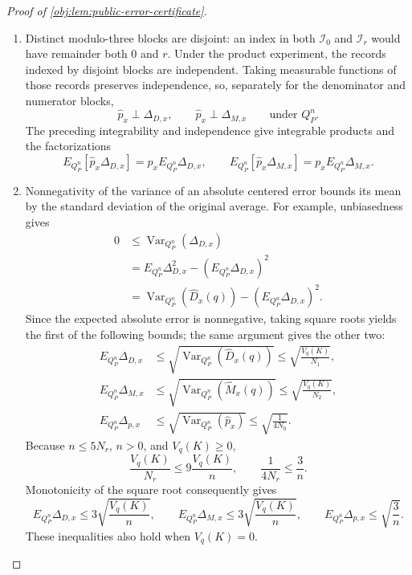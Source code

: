 \begin{proof}[Proof of \cref{obj:lem:public-error-certificate}]
\begin{enumerate}
\item
Distinct modulo-three blocks are disjoint: an index in both
\(\mathcal I_0\) and \(\mathcal I_r\) would have remainder both \(0\) and
\(r\). Under the product experiment, the records indexed by disjoint
blocks are independent. Taking measurable functions of those records
preserves independence, so, separately for the denominator and numerator
blocks,
\[
\widehat p_x\perp\Delta_{D,x},
\qquad
\widehat p_x\perp\Delta_{M,x}
\qquad\text{under }Q_P^n.
\]
The preceding integrability and independence give integrable products and
the factorizations
\[
E_{Q_P^n}[\widehat p_x\Delta_{D,x}]
=p_xE_{Q_P^n}\Delta_{D,x},
\qquad
E_{Q_P^n}[\widehat p_x\Delta_{M,x}]
=p_xE_{Q_P^n}\Delta_{M,x}.
\]

\item
Nonnegativity of the variance of an absolute centered error bounds its
mean by the standard deviation of the original average. For example,
unbiasedness gives
\[
\begin{aligned}
0
&\le\operatorname{Var}_{Q_P^n}(\Delta_{D,x})\\
&=E_{Q_P^n}\Delta_{D,x}^2
  -(E_{Q_P^n}\Delta_{D,x})^2\\
&=\operatorname{Var}_{Q_P^n}(\widehat D_x(q))
  -(E_{Q_P^n}\Delta_{D,x})^2.
\end{aligned}
\]
Since the expected absolute error is nonnegative, taking square roots
yields the first of the following bounds; the same argument gives the
other two:
\[
\begin{aligned}
E_{Q_P^n}\Delta_{D,x}
&\le\sqrt{\operatorname{Var}_{Q_P^n}(\widehat D_x(q))}
\le\sqrt{\frac{V_q(K)}{N_1}},\\
E_{Q_P^n}\Delta_{M,x}
&\le\sqrt{\operatorname{Var}_{Q_P^n}(\widehat M_x(q))}
\le\sqrt{\frac{V_q(K)}{N_2}},\\
E_{Q_P^n}\Delta_{p,x}
&\le\sqrt{\operatorname{Var}_{Q_P^n}(\widehat p_x)}
\le\sqrt{\frac1{4N_0}}.
\end{aligned}
\]
Because \(n\le5N_r\), \(n>0\), and \(V_q(K)\ge0\),
\[
\frac{V_q(K)}{N_r}\le9\frac{V_q(K)}{n},
\qquad
\frac1{4N_r}\le\frac3n.
\]
Monotonicity of the square root consequently gives
\[
E_{Q_P^n}\Delta_{D,x}\le3\sqrt{\frac{V_q(K)}{n}},
\qquad
E_{Q_P^n}\Delta_{M,x}\le3\sqrt{\frac{V_q(K)}{n}},
\qquad
E_{Q_P^n}\Delta_{p,x}\le\sqrt{\frac3n}.
\]
These inequalities also hold when \(V_q(K)=0\).


\end{enumerate}
\end{proof}
